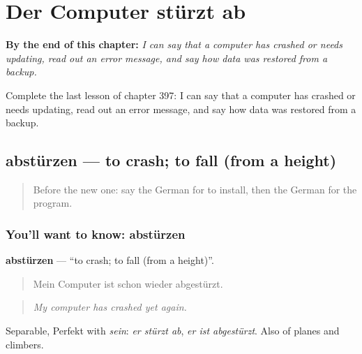 
\chapter{Der Computer stürzt ab}
\label{ch:ge-der-computer-sturzt-ab}

\begin{chapteropening}
\textbf{By the end of this chapter:} \emph{I can say that a computer has crashed or needs updating, read out an error message, and say how data was restored from a backup.}

Complete the last lesson of chapter 397: I can say that a computer has crashed or needs updating, read out an error message, and say how data was restored from a backup.
\end{chapteropening}

\section[abstürzen]{abstürzen — to crash; to fall (from a height)}

\label{lesson:GE-C397-abstuerzen}



\begin{quote}
Before the new one: say the German for to install, then the German for the program.
\end{quote}

\subsection*{You'll want to know: abstürzen}
\textbf{abstürzen} — \textquotedblleft{}to crash; to fall (from a height)\textquotedblright{}.

\begin{quote}
Mein Computer ist schon wieder abgestürzt.
\end{quote}

\begin{quote}
\emph{My computer has crashed yet again.}
\end{quote}

Separable, Perfekt with \emph{sein}: \emph{er stürzt ab}, \emph{er ist abgestürzt}. Also of planes and climbers.

